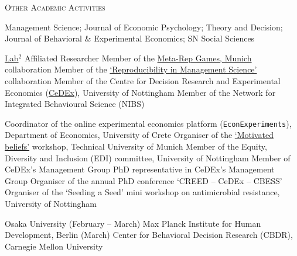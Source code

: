 \begin{rubric}{\textsc{Other Academic Activities}}


\entry*[Refereeing] Management Science; Journal of Economic Psychology; Theory and Decision; Journal of Behavioral \& Experimental Economics; SN Social Sciences


 \href{https://labsquare.net/aboutus/team}{Lab$^2$} Affiliated Researcher
\entry*[2024] Member of the \href{https://www.meta-rep.uni-muenchen.de/index.html}{Meta-Rep Games, Munich} collaboration
\entry* Member of the \href{https://pubsonline.informs.org/doi/full/10.1287/mnsc.2023.03556}{`Reproducibility in Management Science'} collaboration 
	Member of the Centre for Decision Research and Experimental Economics (\href{https://www.nottingham.ac.uk/cedex/}{CeDEx}), University of Nottingham
\entry*[2018 -- 2020]%
	Member of the Network for Integrated Behavioural Science (NIBS)


 Coordinator of the online experimental economics platform (\texttt{EconExperiments}), Department of Economics, University of Crete
\entry*[2023] Organiser of the \href{https://sites.google.com/view/motivatedbeliefs/overview?authuser=0}{`Motivated beliefs'} workshop, Technical University of Munich
\entry*[2018 -- 2020] Member of the Equity, Diversity and Inclusion (EDI) committee, University of Nottingham
\entry*[2018 -- 2020] Member of CeDEx's Management Group
\entry*[2016 -- 2018] PhD representative in CeDEx's Management Group 
\entry*[2017] Organiser of the annual PhD conference `CREED -- CeDEx -- CBESS' 
\entry*[2017] Organiser of the `Seeding a Seed' mini workshop on antimicrobial resistance, University of Nottingham


\entry*[2025] Osaka University (February -- March)
\entry*[2023] Max Planck Institute for Human Development, Berlin (March)
\entry*[2019] Center for Behavioral Decision Research (CBDR), Carnegie Mellon University

\end{rubric}

